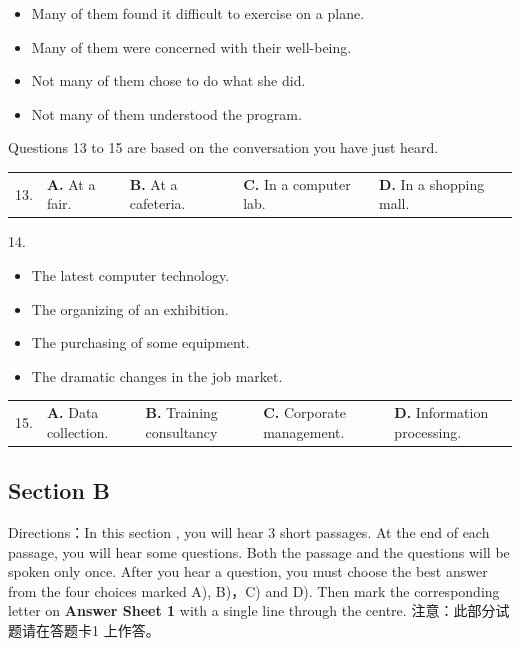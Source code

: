 \documentclass[UTF8,11pt]{ctexart}
\begin{document}
\begin{itemize}[leftmargin=2em,itemsep=.2em,topsep=.4em]\item[A.] Many of them found it difficult to exercise on a plane.
\item[B.] Many of them were concerned with their well-being.
\item[C.] Not many of them chose to do what she did.
\item[D.] Not many of them understood the program.
\end{itemize}

Questions 13 to 15 are based on the conversation you have just heard.


\noindent\begin{tabularx}{\linewidth}{@{}lXXXX@{}}13. & \textbf{A.} At a fair. & \textbf{B.} At a cafeteria. & \textbf{C.} In a computer lab. & \textbf{D.} In a shopping mall.\\\end{tabularx}\par

14.


\begin{itemize}[leftmargin=2em,itemsep=.2em,topsep=.4em]\item[A.] The latest computer technology.
\item[B.] The organizing of an exhibition.
\item[C.] The purchasing of some equipment.
\item[D.] The dramatic changes in the job market.
\end{itemize}

\noindent\begin{tabularx}{\linewidth}{@{}lXXXX@{}}15. & \textbf{A.} Data collection. & \textbf{B.} Training consultancy & \textbf{C.} Corporate management. & \textbf{D.} Information processing.\\\end{tabularx}\par

\subsection*{Section B}


Directions：In this section , you will hear 3 short passages. At the end of each passage, you will hear some questions. Both the passage and the questions will be spoken only once. After you hear a question, you must choose the best answer from the four choices marked A), B)，C) and D). Then mark the corresponding letter on\textbf{ Answer Sheet 1} with a single line through the centre. 注意：此部分试题请在答题卡1 上作答。
\end{document}
